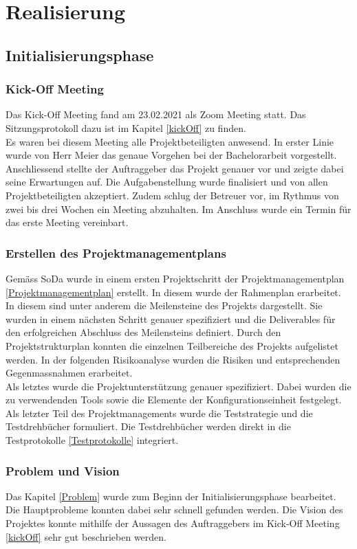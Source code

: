\section{Realisierung}\label{realisierung}
\subsection{Initialisierungsphase}
\subsubsection{Kick-Off Meeting}
Das Kick-Off Meeting fand am 23.02.2021 als Zoom Meeting statt. Das Sitzungsprotokoll dazu ist im Kapitel \ref{kickOff} zu finden. \\
Es waren bei diesem Meeting alle Projektbeteiligten anwesend. In erster Linie wurde von Herr Meier das genaue Vorgehen bei der Bachelorarbeit vorgestellt. Anschliessend stellte der Auftraggeber das Projekt genauer vor und zeigte dabei seine Erwartungen auf. Die Aufgabenstellung wurde finalisiert und von allen Projektbeteiligten akzeptiert. Zudem schlug der Betreuer vor, im Rythmus von zwei bis drei Wochen ein Meeting abzuhalten. Im Anschluss wurde ein Termin für das erste Meeting vereinbart. 
\subsubsection{Erstellen des Projektmanagementplans}
Gemäss \ac{SoDa} wurde in einem ersten Projektschritt der Projektmanagementplan \ref{Projektmanagementplan} erstellt. In diesem wurde der Rahmenplan erarbeitet. In diesem sind unter anderem die Meilensteine des Projekts dargestellt. Sie wurden in einem nächsten Schritt genauer spezifiziert und die Deliverables für den erfolgreichen Abschluss des Meilensteins definiert. Durch den Projektstrukturplan konnten die einzelnen Teilbereiche des Projekts aufgelistet werden.
In der folgenden Risikoanalyse wurden die Risiken und entsprechenden Gegenmassnahmen erarbeitet. \\
Als letztes wurde die Projektunterstützung genauer spezifiziert. Dabei wurden die zu verwendenden Tools sowie die Elemente der Konfigurationseinheit festgelegt. \\
Als letzter Teil des Projektmanagements wurde die Teststrategie und die Testdrehbücher formuliert. Die Testdrehbücher werden direkt in die Testprotokolle \ref{Testprotokolle} integriert. 

\subsubsection{Problem und Vision}
Das Kapitel \ref{Problem} wurde zum Beginn der Initialisierungsphase bearbeitet. Die Hauptprobleme konnten dabei sehr schnell gefunden werden. Die Vision des Projektes konnte mithilfe der Aussagen des Auftraggebers im Kick-Off Meeting \ref{kickOff} sehr gut beschrieben werden. 
